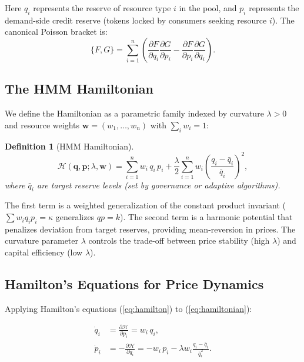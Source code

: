 \documentclass[11pt,twocolumn]{article}
\newtheorem{definition}{Definition}
\begin{document}
Here $q_i$ represents the reserve of resource type $i$ in the pool, and $p_i$ represents the demand-side credit reserve (tokens locked by consumers seeking resource $i$). The canonical Poisson bracket is:
\begin{equation}
\{F, G\} = \sum_{i=1}^n \left(\frac{\partial F}{\partial q_i}\frac{\partial G}{\partial p_i} - \frac{\partial F}{\partial p_i}\frac{\partial G}{\partial q_i}\right).
\end{equation}

\subsection{The HMM Hamiltonian}

We define the Hamiltonian as a parametric family indexed by curvature $\lambda > 0$ and resource weights $\bm{w} = (w_1, \ldots, w_n)$ with $\sum_i w_i = 1$:

\begin{definition}[HMM Hamiltonian]
\begin{equation}
\mathcal{H}(\bm{q}, \bm{p}; \lambda, \bm{w}) = \sum_{i=1}^n w_i \, q_i \, p_i + \frac{\lambda}{2} \sum_{i=1}^n w_i \left(\frac{q_i - \bar{q}_i}{\bar{q}_i}\right)^2,
\label{eq:hamiltonian}
\end{equation}
where $\bar{q}_i$ are target reserve levels (set by governance or adaptive algorithms).
\end{definition}

The first term is a weighted generalization of the constant product invariant ($\sum w_i q_i p_i = \kappa$ generalizes $qp = k$). The second term is a harmonic potential that penalizes deviation from target reserves, providing mean-reversion in prices. The curvature parameter $\lambda$ controls the trade-off between price stability (high $\lambda$) and capital efficiency (low $\lambda$).

\subsection{Hamilton's Equations for Price Dynamics}

Applying Hamilton's equations (\ref{eq:hamilton}) to (\ref{eq:hamiltonian}):

\begin{align}
\dot{q}_i &= \frac{\partial \mathcal{H}}{\partial p_i} = w_i \, q_i, \label{eq:qdot} \\
\dot{p}_i &= -\frac{\partial \mathcal{H}}{\partial q_i} = -w_i \, p_i - \lambda w_i \frac{q_i - \bar{q}_i}{\bar{q}_i^2}. \label{eq:pdot}
\end{align}
\end{document}
